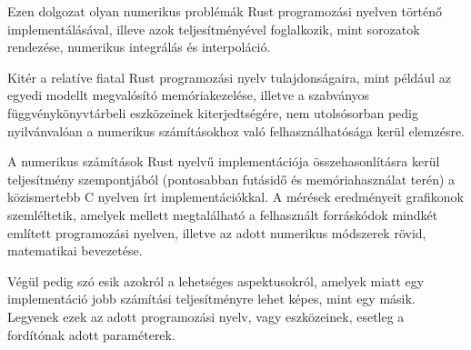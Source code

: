 
Ezen dolgozat olyan numerikus problémák Rust programozási nyelven történő implementálásával, illeve azok teljesítményével foglalkozik, mint sorozatok rendezése, numerikus integrálás és interpoláció.

Kitér a relatíve fiatal Rust programozási nyelv tulajdonságaira, mint például az egyedi modellt megvalósító memóriakezelése, illetve a szabványos függvénykönyvtárbeli eszközeinek kiterjedtségére, nem utolsósorban pedig nyilvánvalóan a numerikus számításokhoz való felhasználhatósága kerül elemzésre.

A numerikus számítások Rust nyelvű implementációja összehasonlításra kerül teljesítmény szempontjából (pontosabban futásidő és memóriahasználat terén) a közismertebb C nyelven írt implementációkkal. A mérések eredményeit grafikonok szemléltetik, amelyek mellett megtalálható a felhasznált forráskódok mindkét említett programozási nyelven, illetve az adott numerikus módszerek rövid, matematikai bevezetése.

Végül pedig szó esik azokról a lehetséges aspektusokról, amelyek miatt egy implementáció jobb számítási teljesítményre lehet képes, mint egy másik. Legyenek ezek az adott programozási nyelv, vagy eszközeinek, esetleg a fordítónak adott paraméterek. 
